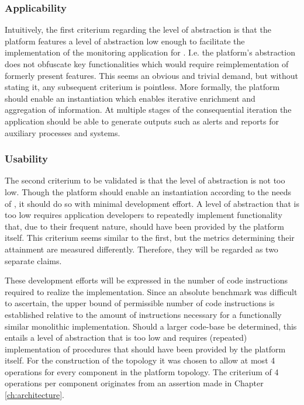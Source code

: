 \subsubsection{Applicability}
Intuitively, the first criterium regarding the level of abstraction is that the platform features a level of abstraction low enough to facilitate the implementation of the monitoring application for \sensitnospace. I.e. the platform's abstraction does not obfuscate key functionalities which would require reimplementation of formerly present features. This seems an obvious and trivial demand, but without stating it, any subsequent criterium is pointless. More formally, the platform should enable an instantiation which enables iterative enrichment and aggregation of information. At multiple stages of the consequential iteration the application should be able to generate outputs such as alerts and reports for auxiliary processes and systems.

\subsubsection{Usability}
The second criterium to be validated is that the level of abstraction is not too low. Though the platform should enable an instantiation according to the needs of \nedap\idsystemsnospace, it should do so with minimal development effort. A level of abstraction that is too low requires application developers to repeatedly implement functionality that, due to their frequent nature, should have been provided by the platform itself. This criterium seems similar to the first, but the metrics determining their attainment are measured differently. Therefore, they will be regarded as two separate claims.

These development efforts will be expressed in the number of code instructions required to realize the implementation. Since an absolute benchmark was difficult to ascertain, the upper bound of permissible number of code instructions is established relative to the amount of instructions necessary for a functionally similar monolithic implementation. Should a larger code-base be determined, this entails a level of abstraction that is too low and requires (repeated) implementation of procedures that should have been provided by the platform itself. For the construction of the topology it was chosen to allow at most 4 operations for every component in the platform topology. The criterium of 4 operations per component originates from an assertion made in Chapter \ref{ch:architecture}.

